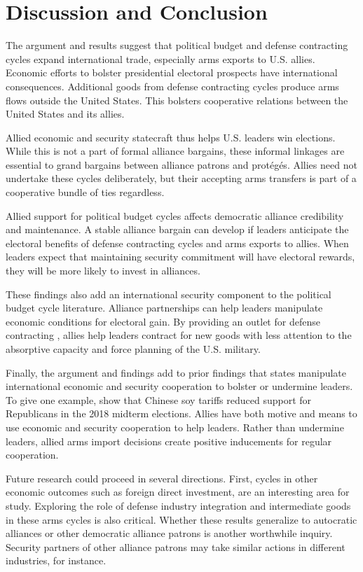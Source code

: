 \documentclass[12pt]{article}
\begin{document}
\section{Discussion and Conclusion}


The argument and results suggest that political budget and defense contracting cycles expand international trade, especially arms exports to U.S. allies. 
Economic efforts to bolster presidential electoral prospects have international consequences. 
Additional goods from defense contracting cycles produce arms flows outside the United States.
This bolsters cooperative relations between the United States and its allies.


Allied economic and security statecraft thus helps U.S. leaders win elections. 
While this is not a part of formal alliance bargains, these informal linkages are essential to grand bargains between alliance patrons and prot{\'e}g{\'e}s.
Allies need not undertake these cycles deliberately, but their accepting arms transfers is part of a cooperative bundle of ties regardless.


Allied support for political budget cycles affects democratic alliance credibility and maintenance. 
A stable alliance bargain can develop if leaders anticipate the electoral benefits of defense contracting cycles and arms exports to allies.
When leaders expect that maintaining security commitment will have electoral rewards, they will be more likely to invest in alliances. 


These findings also add an international security component to the political budget cycle literature.
Alliance partnerships can help leaders manipulate economic conditions for electoral gain. 
By providing an outlet for defense contracting , allies help leaders contract for new goods with less attention to the absorptive capacity and force planning of the U.S. military.


Finally, the argument and findings add to prior findings that states manipulate international economic and security cooperation to bolster or undermine leaders. 
To give one example, \citet{ChyzhUrbatsch2021} show that Chinese soy tariffs reduced support for Republicans in the 2018 midterm elections. 
Allies have both motive and means to use economic and security cooperation to help leaders. 
Rather than undermine leaders, allied arms import decisions create positive inducements for regular cooperation.


Future research could proceed in several directions. 
First, cycles in other economic outcomes such as foreign direct investment, are an interesting area for study. 
Exploring the role of defense industry integration and intermediate goods in these arms cycles is also critical.
Whether these results generalize to autocratic alliances or other democratic alliance patrons is another worthwhile inquiry. 
Security partners of other alliance patrons may take similar actions in different industries, for instance.
\end{document}

